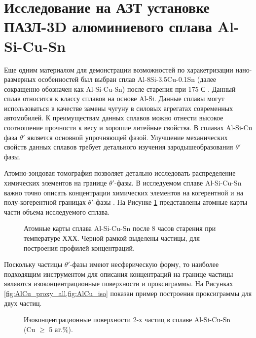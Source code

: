 \FloatBarrier

\section{Исследование на АЗТ установке ПАЗЛ-3D алюминиевого сплава Al-Si-Cu-Sn}\label{sec:ch4/sect4}


Еще одним материалом для демонстрации возможностей по харакетризации нано-размерных особенностей был выбран сплав Al-8Si-3.5Cu-0.1Sn (далее сокращенно обозначен как Al-Si-Cu-Sn) после старения при 175 \textdegree С \cite{Akopyan2022A319}. Данный сплав относится к классу сплавов на основе Al-Si. Данные сплавы могут использоваться в качестве замены чугуну в силовых агрегатах современных автомобилей. К преимуществам данных сплавов можно отнести высокое соотношение прочности к весу и хорошие литейные свойства. В сплавах Al-Si-Cu фаза $\theta '$ является основной упрочняющей фазой. Улучшение механических свойств данных сплавов требует детального изучения зародышеобразования $\theta '$ фазы. 

Атомно-зондовая томография позволяет детально исследовать распределение химических элементов на границе $\theta '$-фазы. В исследуемом сплаве Al-Si-Cu-Sn важно точно описать концентрации химических элементов на когерентной и на полу-когерентной границах  $\theta '$-фазы \cite{Akopyan2022A319}. На Рисунке \cref{fig:AlCu_atom_maps} представлены атомные карты части объема исследуемого сплава.

\begin{figure}[htb]
	\caption{Атомные карты сплава Al-Si-Cu-Sn после 8 часов старения при температуре ХХХ. Черной рамкой выделены частицы, для построения профилей концентраций.}
	\label{fig:AlCu_atom_maps}
\end{figure}


Поскольку частицы $\theta '$-фазы имеют несферическую форму, то наиболее подходящим инструментом для описания концентраций на границе частицы являются изоконцентрационные поверхности и проксиграммы. На Рисунках \cref{fig:AlCu_proxy_all,fig:AlCu_iso} показан пример построения проксиграммы для двух частиц.

\begin{figure}[htb]
	\caption{Изоконцентрационные поверхности 2-х частиц в сплаве Al-Si-Cu-Sn (Cu $\geq$ 5 ат.\%).}
	\label{fig:AlCu_iso}
\end{figure}


